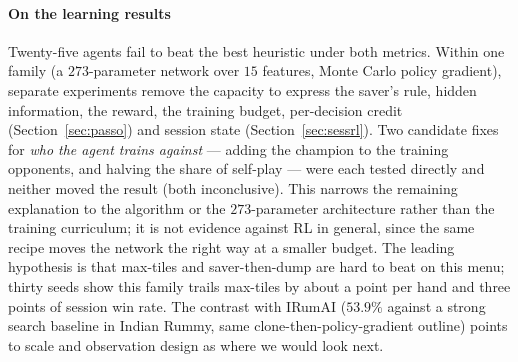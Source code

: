 \documentclass[10pt,journal,compsoc]{IEEEtran}
\begin{document}
\paragraph*{On the learning results}
Twenty-five agents fail to beat the best heuristic under both metrics. Within one family (a $273$-parameter network over $15$ features, Monte Carlo policy gradient), separate experiments remove the capacity to express the saver's rule, hidden information, the reward, the training budget, per-decision credit (Section~\ref{sec:passo}) and session state (Section~\ref{sec:sessrl}). Two candidate fixes for \emph{who the agent trains against} --- adding the champion to the training opponents, and halving the share of self-play --- were each tested directly and neither moved the result (both inconclusive). This narrows the remaining explanation to the algorithm or the $273$-parameter architecture rather than the training curriculum; it is not evidence against RL in general, since the same recipe moves the network the right way at a smaller budget. The leading hypothesis is that max-tiles and saver-then-dump are hard to beat on this menu; thirty seeds show this family trails max-tiles by about a point per hand and three points of session win rate. The contrast with IRumAI \cite{mohan2026} ($53.9\%$ against a strong search baseline in Indian Rummy, same clone-then-policy-gradient outline) points to scale and observation design as where we would look next.
\end{document}
